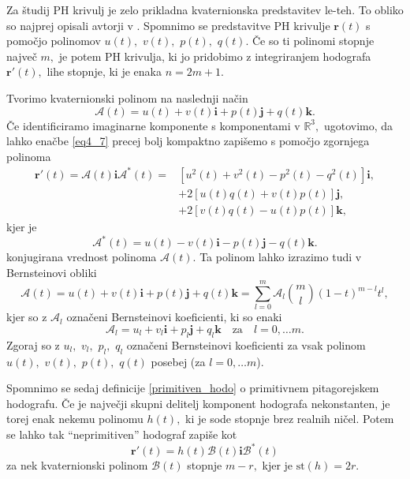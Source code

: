 \documentclass[12pt,a4paper,twoside]{article}
\theoremstyle{definition} %
\theoremstyle{plain} %
\numberwithin{equation}{section}  %
\newcommand{\R}{\mathbb R}
\begin{document}
Za študij PH krivulj je zelo prikladna kvaternionska predstavitev le-teh. To obliko so najprej opisali avtorji v \cite{choi2002clifford}. Spomnimo se predstavitve PH krivulje $\mathbf{r}(t)$ s pomočjo polinomov $u(t),$ $v(t),$ $p(t),$ $q(t)$. Če so ti polinomi stopnje največ $m,$ je potem PH krivulja, ki jo pridobimo z integriranjem hodografa $\mathbf{r'}(t),$ lihe stopnje, ki je enaka $n=2m+1.$

Tvorimo kvaternionski polinom na naslednji način
\begin{equation}
	\mathcal{A}(t)=u(t)+v(t)\mathbf{i}+p(t)\mathbf{j}+q(t)\mathbf{k}.
\end{equation}
Če identificiramo imaginarne komponente s komponentami v $\R^3,$ ugotovimo, da lahko enačbe \eqref{eq4_7} precej bolj kompaktno zapišemo s pomočjo zgornjega polinoma
\begin{align}
	\mathbf{r'}(t)=\mathcal{A}(t)\mathbf{i}\mathcal{A}^*(t)=&[u^2(t)+v^2(t)-p^2(t)-q^2(t)]\mathbf{i}, \nonumber \\
	&+2[u(t)q(t)+v(t)p(t)]\mathbf{j}, \nonumber \\
	&+2[v(t)q(t)-u(t)p(t)]\mathbf{k}, \label{kvaternion}
\end{align}
kjer je
\begin{equation}
	\mathcal{A}^*(t)=u(t)-v(t)\mathbf{i}-p(t)\mathbf{j}-q(t)\mathbf{k}.
\end{equation}
konjugirana vrednost polinoma $\mathcal{A}(t).$ Ta polinom lahko izrazimo tudi v Bernsteinovi obliki
\begin{equation}
	\mathcal{A}(t)=u(t)+v(t)\mathbf{i}+p(t)\mathbf{j}+q(t)\mathbf{k}=\sum_{l=0}^m\mathcal{A}_l \binom{m}{l}(1-t)^{m-l}t^l,
\end{equation}
kjer so z $\mathcal{A}_l$ označeni Bernsteinovi koeficienti, ki so enaki
\begin{equation}
	\mathcal{A}_l=u_l+v_l\mathbf{i}+p_l\mathbf{j}+q_l\mathbf{k} \quad \text{za} \quad l=0,\dots m.
\end{equation}
Zgoraj so z $u_l,$ $v_l,$ $p_l,$ $q_l$ označeni Bernsteinovi koeficienti za vsak polinom $u(t),$ $v(t),$ $p(t),$ $q(t)$ posebej (za $l=0,\dots m$).

Spomnimo se sedaj definicije \ref{primitiven_hodo} o primitivnem pitagorejskem hodografu. Če je največji skupni delitelj komponent hodografa nekonstanten, je torej enak nekemu polinomu $h(t),$ ki je sode stopnje brez realnih ničel. Potem se lahko tak ``neprimitiven'' hodograf zapiše kot
\begin{equation}
	\mathbf{r'}(t)=h(t)\mathcal{B}(t)\mathbf{i}\mathcal{B}^*(t)
\end{equation}
za nek kvaternionski polinom $\mathcal{B}(t)$ stopnje $m-r,$ kjer je $\mathrm{st}(h)=2r.$
\end{document}
